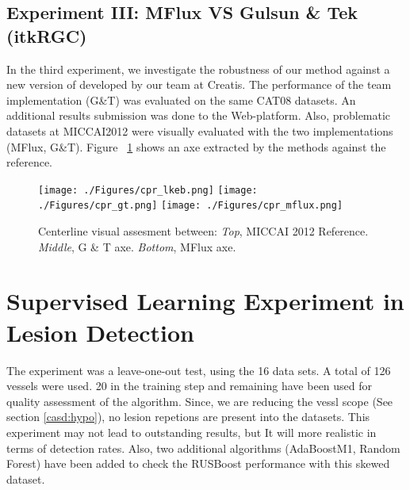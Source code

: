 \subsection{Experiment III: MFlux VS Gulsun \& Tek (itkRGC)}

In the third experiment, we investigate the robustness of our method against a new version of \citep{Tek2008} developed by our team at Creatis. The performance of the team implementation (G\&T) was evaluated on the same CAT08 datasets. An additional results submission was done to the Web-platform. Also, problematic datasets at MICCAI2012 were visually evaluated with the two implementations (MFlux, G\&T). Figure ~\ref{fig:exp3_cpr} shows an axe extracted by the methods against the reference.

\begin{figure}[htbp]
	\centering
		\texttt{[image: ./Figures/cpr\_lkeb.png]}
		\texttt{[image: ./Figures/cpr\_gt.png]}
		\texttt{[image: ./Figures/cpr\_mflux.png]}
	\caption[Centerline Comparison]{Centerline visual assesment between: \textit{Top}, MICCAI 2012 Reference. \textit{Middle}, G \& T axe. \textit{Bottom}, MFlux axe.}
	\label{fig:exp3_cpr}
\end{figure}

\section{Supervised Learning Experiment in Lesion Detection}

The experiment was a leave-one-out test, using the 16 data sets. A total of 126 vessels were used. 20 in the training step and remaining  have been used for quality assessment of the algorithm. Since, we are reducing the vessl scope (See section \ref{casd:hypo}),  no lesion repetions are present into the datasets. This experiment may not lead to outstanding results, but It will more realistic in terms of detection rates. Also, two additional algorithms (AdaBoostM1, Random Forest) have been added to check the RUSBoost performance with this skewed dataset.